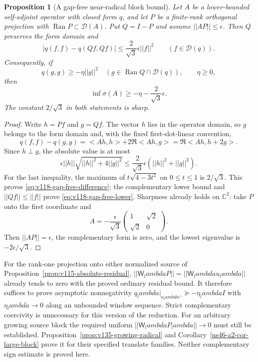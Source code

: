 \documentclass[11pt]{article}
\def\lambda{lambda}%
\def\norm#1{||#1||}%
\def\ip#1#2{<#1,#2>}%
\newtheorem{proposition}[theorem]{Proposition}
\theoremstyle{remark}
\newcommand{\norm}[1]{\left\lVert #1\right\rVert}
\newcommand{\ip}[2]{\left\langle #1,#2\right\rangle}
\begin{document}
\begin{proposition}[A gap-free near-radical block bound]
\label{prop:v118-gap-free}
Let $A$ be a lower-bounded self-adjoint operator with closed form $q$,
and let $P$ be a finite-rank orthogonal projection with
$\operatorname{Ran}P\subset\mathcal D(A)$.  Put $Q=I-P$ and assume
$\norm{AP}\le\epsilon$.  Then $Q$ preserves the form domain and
\begin{equation}\label{eq:v118-gap-free-difference}
 \left|q(f,f)-q(Qf,Qf)\right|
 \le\frac{2}{\sqrt3}\epsilon\norm f^2
 \qquad(f\in\mathcal D(q)).
\end{equation}
Consequently, if
\[
 q(g,g)\ge-\eta\norm g^2\quad
 (g\in\operatorname{Ran}Q\cap\mathcal D(q)),\qquad \eta\ge0,
\]
then
\begin{equation}\label{eq:v118-gap-free-lower}
 \inf\sigma(A)\ge-\eta-\frac{2}{\sqrt3}\epsilon.
\end{equation}
The constant $2/\sqrt3$ in both statements is sharp.
\end{proposition}
\begin{proof}
Write $h=Pf$ and $g=Qf$.  The vector $h$ lies in the operator domain,
so $g$ belongs to the form domain and, with the fixed first-slot-linear
convention,
\[
 q(f,f)-q(g,g)
 =\ip{Ah}{h}+2\Re\ip{Ah}{g}
 =\Re\ip{Ah}{h+2g}.
\]
Since $h\perp g$, the absolute value is at most
\[
 \epsilon\norm h\sqrt{\norm h^2+4\norm g^2}
 \le\frac{2}{\sqrt3}\epsilon
           (\norm h^2+\norm g^2).
\]
For the last inequality, the maximum of
$t\sqrt{4-3t^2}$ on $0\le t\le1$ is $2/\sqrt3$.
This proves \eqref{eq:v118-gap-free-difference}; the complementary
lower bound and $\norm{Qf}\le\norm f$ prove
\eqref{eq:v118-gap-free-lower}.  Sharpness already holds on
$\mathbb C^2$: take $P$ onto the first coordinate and
\[
 A=-\frac{\epsilon}{\sqrt3}
   \begin{pmatrix}1&\sqrt2\\\sqrt2&0\end{pmatrix}.
\]
Then $\norm{AP}=\epsilon$, the complementary form is zero, and the
lowest eigenvalue is $-2\epsilon/\sqrt3$.
\end{proof}

For the rank-one projection onto either normalized source of
Proposition~\ref{prop:v115-absolute-residual},
$\norm{\mathsf W_\lambda P}=\norm{\mathsf W_\lambda u_\lambda}$
already tends to zero with the proved ordinary residual bound.
It therefore suffices to prove asymptotic nonnegativity
$q_\lambda|_{u_\lambda^\perp}\succeq-\eta_\lambda I$ with
$\eta_\lambda\to0$ along an unbounded window sequence.  Strict
complementary coercivity is unnecessary for this version of the
reduction.  For an arbitrary growing source block the required uniform
$\norm{\mathsf W_\lambda P_\lambda}\to0$ must still be established.
Proposition~\ref{prop:v135-growing-radical} and
Corollary~\ref{ns46-a2-cor-large-block} prove it for their specified
translate families. Neither complementary sign estimate is proved here.
\end{document}
